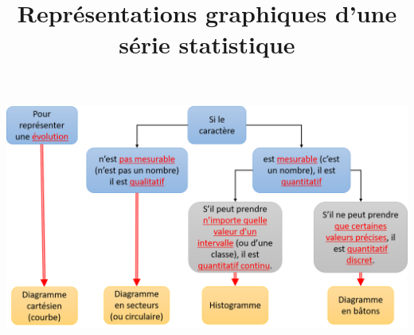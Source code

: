 \documentclass[12pt,a4paper]{article}
\date{}
\title{Représentations graphiques d'une série statistique }
\begin{document}


%	
%	
%	
%
%	
%	
%	
%
%
%			
%
%		
%			
%			
%	

\begin{center}
	\includegraphics[scale=0.62]{img/bilan}
\end{center}
\end{document}
